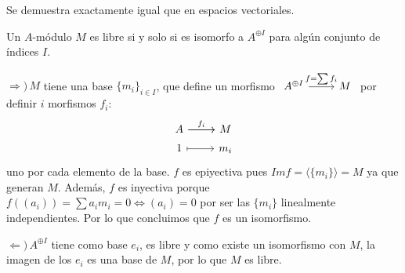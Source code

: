 \begin{sol}
    Se demuestra exactamente igual que en espacios vectoriales.
\end{sol}
\begin{teo}
    Un $A$-m\'odulo $M$ es libre si y solo si es isomorfo a $A^{\oplus I}$ para alg\'un conjunto de \'indices $I$.
\end{teo}
\begin{dem}
    $\Rightarrow ) \, M$ tiene una base $\{m_i\}_{i \in I}$, que define un morfismo $\bt A^{\oplus I} \arrow{r}{f=\sum f_i} & M \et$ por definir $i$ morfismos $f_i$:
    $$\bt A \arrow{r}{f_i} \arrow{r} & M \\[-5mm] 1 \arrow[mapsto]{r} & m_i\et$$
    uno por cada elemento de la base. $f$ es epiyectiva pues $Im f = \langle \{ m_i \} \rangle = M$ ya que generan $M$. Adem\'as, $f$ es inyectiva porque $f((a_i)) = \sum a_i m_i = 0 \iff (a_i) = 0$ por ser las $\{m_i\}$ linealmente independientes. Por lo que concluimos que $f$ es un isomorfismo.

    $\Leftarrow) \, A^{\oplus I}$ tiene como base $e_i$, es libre y como existe un isomorfismo con $M$, la imagen de los $e_i$ es una base de $M$, por lo que $M$ es libre.
\end{dem}

